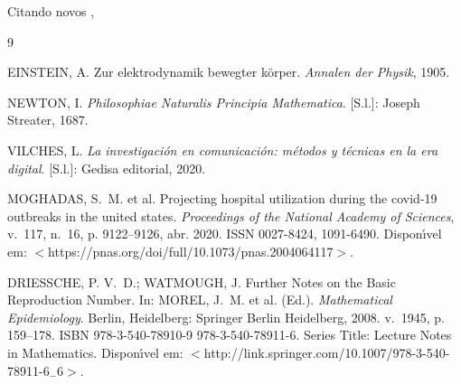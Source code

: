 \documentclass[12pt, brazilian]{article}
\begin{document}
Citando novos \cite{moghadas_projecting_2020}, \cite{morel_further_2008}


 \begin{thebibliography}{9}

{EINSTEIN, A. Zur elektrodynamik bewegter k{\"o}rper.
\emph{Annalen der Physik}, 1905.}

{NEWTON, I. \emph{Philosophiae Naturalis Principia Mathematica}. [S.l.]: Joseph
  Streater, 1687.}

{VILCHES, L. \emph{La investigaci{\'o}n en comunicaci{\'o}n: m{\'e}todos y
  t{\'e}cnicas en la era digital}. [S.l.]: Gedisa editorial, 2020.}

{MOGHADAS, S.~M. et al. Projecting hospital utilization during the covid-19
  outbreaks in the united states.
\emph{Proceedings of the National Academy of Sciences}, v.~117, n.~16, p.
  9122--9126, abr. 2020.
ISSN 0027-8424, 1091-6490.
Dispon{\'\i}vel em: $<$https://pnas.org/doi/full/10.1073/pnas.2004064117$>$.}

{DRIESSCHE, P. V.~D.; WATMOUGH, J. Further {Notes} on the {Basic}
  {Reproduction} {Number}. In:  MOREL, J.~M. et al. (Ed.). \emph{Mathematical
  {Epidemiology}}. Berlin, Heidelberg: Springer Berlin Heidelberg, 2008.
  v.~1945, p. 159--178.
ISBN 978-3-540-78910-9 978-3-540-78911-6.
Series Title: Lecture Notes in Mathematics.
Dispon{\'\i}vel em:
  $<$http://link.springer.com/10.1007/978-3-540-78911-6$_-$6$>$.}

\end{thebibliography}

%

\end{document}
